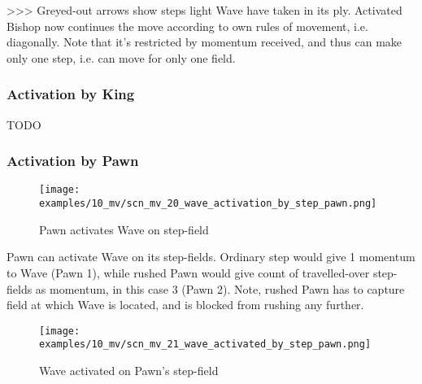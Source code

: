 \textgreater \textgreater \textgreater
Greyed-out arrows show steps light Wave have taken in its ply. Activated Bishop
now continues the move according to own rules of movement, i.e. diagonally. Note
that it's restricted by momentum received, and thus can make only one step, i.e.
can move for only one field.

\clearpage %

\subsubsection*{Activation by King}

\huge
TODO
\normalsize

\clearpage %

\subsubsection*{Activation by Pawn}

\vspace*{-1.4\baselineskip}
\noindent
\begin{figure}[!h]
\texttt{[image: examples/10\_mv/scn\_mv\_20\_wave\_activation\_by\_step\_pawn.png]}
\caption{Pawn activates Wave on step-field}
\label{fig:scn_mv_20_wave_activation_by_step_pawn}
\end{figure}

Pawn can activate Wave on its step-fields. Ordinary step would give 1 momentum to
Wave (Pawn 1), while rushed Pawn would give count of travelled-over step-fields as
momentum, in this case 3 (Pawn 2). Note, rushed Pawn has to capture field at which
Wave is located, and is blocked from rushing any further.

\clearpage %

\vspace*{-2.1\baselineskip}
\noindent
\begin{figure}[!h]
\texttt{[image: examples/10\_mv/scn\_mv\_21\_wave\_activated\_by\_step\_pawn.png]}
\caption{Wave activated on Pawn's step-field}
\label{fig:scn_mv_21_wave_activated_by_step_pawn}
\end{figure}

